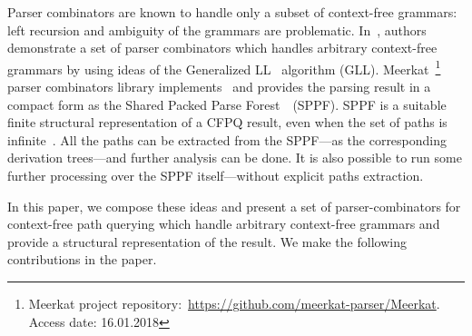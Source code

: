 Parser combinators are known to handle only a subset of context-free grammars: left recursion and ambiguity of the grammars are problematic. 
In~\cite{Meerkat}, authors demonstrate a set of parser combinators which handles arbitrary context-free grammars by using ideas of the Generalized LL~\cite{scott2010gll} algorithm (GLL). 
Meerkat~\footnote{Meerkat project repository:~\url{https://github.com/meerkat-parser/Meerkat}. Access date: 16.01.2018} parser combinators library implements~\cite{Meerkat} and provides the parsing result in a compact form as the Shared Packed Parse Forest~\cite{SPPF}~(SPPF).
SPPF is a suitable finite structural representation of a CFPQ result, even when the set of paths is infinite~\cite{GrigorevR16}. 
All the paths can be extracted from the SPPF---as the corresponding derivation trees---and further analysis can be done. 
It is also possible to run some further processing over the SPPF itself---without explicit paths extraction.


In this paper, we compose these ideas and present a set of parser-combinators for context-free path querying which handle arbitrary context-free grammars and provide a structural representation of the result. 
We make the following contributions in the paper.


